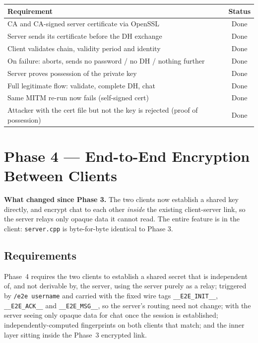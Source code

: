 \documentclass[11pt,a4paper]{article}
\begin{document}
\begin{center}
\small
\begin{tabular}{@{}lc@{}}
\toprule
\textbf{Requirement} & \textbf{Status} \\
\midrule
CA and CA-signed server certificate via OpenSSL & Done \\
Server sends its certificate before the DH exchange & Done \\
Client validates chain, validity period and identity & Done \\
On failure: aborts, sends no password / no DH / nothing further & Done \\
Server proves possession of the private key & Done \\
Full legitimate flow: validate, complete DH, chat & Done \\
Same MITM re-run now fails (self-signed cert) & Done \\
Attacker with the cert file but not the key is rejected (proof of possession) & Done \\
\bottomrule
\end{tabular}
\end{center}

\section{Phase 4 --- End-to-End Encryption Between Clients}

\begin{keybox}
\textbf{What changed since Phase 3.} The two clients now establish a shared key directly, and encrypt
chat to each other \emph{inside} the existing client-server link, so the server relays only opaque
data it cannot read. The entire feature is in the client: \texttt{server.cpp} is byte-for-byte
identical to Phase 3.
\end{keybox}

\subsection{Requirements}

Phase~4 requires the two clients to establish a shared secret that is independent of, and not
derivable by, the server, using the server purely as a relay; triggered by \texttt{/e2e username} and
carried with the fixed wire tags \texttt{\_\_E2E\_INIT\_\_}, \texttt{\_\_E2E\_ACK\_\_} and
\texttt{\_\_E2E\_MSG\_\_}, so the server's routing need not change; with the server seeing only opaque
data for chat once the session is established; independently-computed fingerprints on both clients
that match; and the inner layer sitting inside the Phase~3 encrypted link.
\end{document}
